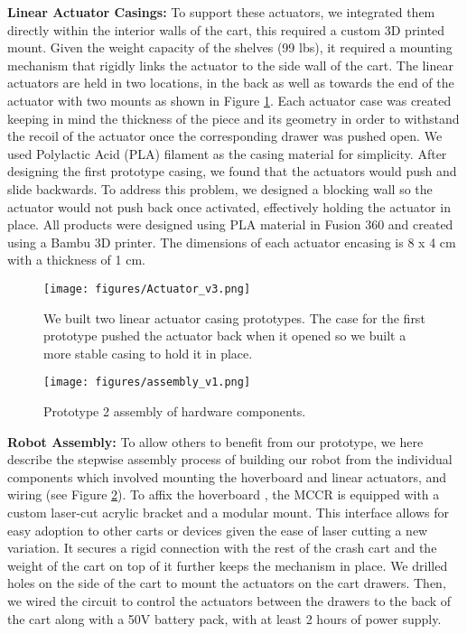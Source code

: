 \textbf{Linear Actuator Casings:} To support these actuators, we integrated them directly within the interior walls of the cart, this required a custom 3D printed mount.
Given the weight capacity of the shelves (99 lbs), it required a mounting mechanism that rigidly links the actuator to the side wall of the cart.
The linear actuators are held in two locations, in the back as well as towards the end of the actuator with two mounts as shown in Figure \ref{fig:actuator}.
Each actuator case was created keeping in mind the thickness of the piece and its geometry in order to withstand the recoil of the actuator once the corresponding drawer was pushed open. 
We used Polylactic Acid (PLA) filament as the casing material for simplicity.
After designing the first prototype casing, we found that the actuators would push and slide backwards. 
To address this problem, we designed a blocking wall so the actuator would not push back once activated, effectively holding the actuator in place. 
All products were designed using PLA material in Fusion 360 and created using a Bambu 3D printer. 
The dimensions of each actuator encasing is 8 x 4 cm with a thickness of 1 cm. 





\begin{figure}[t] 
\centering 
\texttt{[image: figures/Actuator\_v3.png]} 
\caption{We built two linear actuator casing prototypes. The case for the first prototype pushed the actuator back when it opened so we built a more stable casing to hold it in place.} 
\label{fig:actuator}
\end{figure}


 \begin{figure}[t] 
	\centering 
	\texttt{[image: figures/assembly\_v1.png]} 
	\caption{Prototype 2 assembly of hardware components.} 
	\label{fig:assembly} 
\end{figure}

\textbf{Robot Assembly:} To allow others to benefit from our prototype, we here describe the stepwise assembly process of building our robot from the individual components which involved mounting the hoverboard and linear actuators, and wiring (see Figure \ref{fig:assembly}). 
To affix the hoverboard \cite{mandel2023recapturing}, the MCCR is equipped with a custom laser-cut acrylic bracket and a modular mount. 
This interface allows for easy adoption to other carts or devices given the ease of laser cutting a new variation. 
It secures a rigid connection with the rest of the crash cart and the weight of the cart on top of it further keeps the mechanism in place.
We drilled holes on the side of the cart to mount the actuators on the cart drawers. 
Then, we wired the circuit to control the actuators between the drawers to the back of the cart along with a 50V battery pack, with at least 2 hours of power supply.


